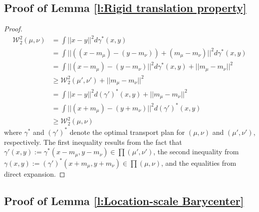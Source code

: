 \documentclass[twoside,11pt]{article}
\begin{document}
\subsection{Proof of Lemma \ref{l:Rigid translation property}}

\begin{proof}
\begin{align*}
\mathcal{W}_2^2(\mu,\nu) & = \int ||x - y||^2 d\gamma^*(x,y)\\
& = \int ||((x - m_{\mu}) - (y - m_{\nu})) + (m_{\mu} - m_{\nu})||^2 d\gamma^*(x,y)\\
& =  \int ||(x - m_{\mu}) - (y - m_{\nu})||^2 d\gamma^*(x,y) +  ||m_{\mu} - m_{\nu}||^2\\
& \geq \mathcal{W}_2^2(\mu',\nu') + ||m_{\mu} - m_{\nu}||^2\\
& = \int ||x - y||^2 d(\gamma')^*(x,y) +  ||m_{\mu} - m_{\nu}||^2\\
& = \int ||(x + m_{\mu}) - (y + m_{\nu})||^2 d(\gamma')^*(x,y)\\
& \geq \mathcal{W}_2^2(\mu,\nu)
\end{align*}
where $\gamma^*$ and $(\gamma')^*$ denote the optimal transport plan for $(\mu,\nu)$ and $(\mu',\nu')$, respectively. The first inequality results from the fact that $\gamma'(x,y) := \gamma^*(x - m_{\mu}, y - m_{\nu}) \in \prod(\mu',\nu')$, the second inequality from $\gamma(x,y) := (\gamma')^*(x + m_{\mu}, y + m_{\nu}) \in \prod(\mu,\nu)$, and the equalities from direct expansion.
\end{proof}

\subsection{Proof of Lemma \ref{l:Location-scale Barycenter}}
\end{document}
